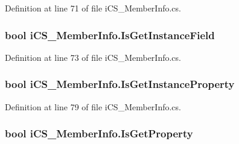 Definition at line 71 of file i\+C\+S\+\_\+\+Member\+Info.\+cs.

\hypertarget{classi_c_s___member_info_aa9b9d1bc86cdb9197b846a478d3dde71}{
\subsubsection[{Is\+Get\+Instance\+Field}]{\setlength{\rightskip}{0pt plus 5cm}bool i\+C\+S\+\_\+\+Member\+Info.\+Is\+Get\+Instance\+Field\hspace{0.3cm}{\ttfamily [get]}}}\label{classi_c_s___member_info_aa9b9d1bc86cdb9197b846a478d3dde71}


Definition at line 73 of file i\+C\+S\+\_\+\+Member\+Info.\+cs.

\hypertarget{classi_c_s___member_info_a42b1a913e3d3ddc81116059e46acf9e4}{
\subsubsection[{Is\+Get\+Instance\+Property}]{\setlength{\rightskip}{0pt plus 5cm}bool i\+C\+S\+\_\+\+Member\+Info.\+Is\+Get\+Instance\+Property\hspace{0.3cm}{\ttfamily [get]}}}\label{classi_c_s___member_info_a42b1a913e3d3ddc81116059e46acf9e4}


Definition at line 79 of file i\+C\+S\+\_\+\+Member\+Info.\+cs.

\hypertarget{classi_c_s___member_info_a573c0d6b161d455dce19497726c77b26}{
\subsubsection[{Is\+Get\+Property}]{\setlength{\rightskip}{0pt plus 5cm}bool i\+C\+S\+\_\+\+Member\+Info.\+Is\+Get\+Property\hspace{0.3cm}{\ttfamily [get]}}}\label{classi_c_s___member_info_a573c0d6b161d455dce19497726c77b26}


